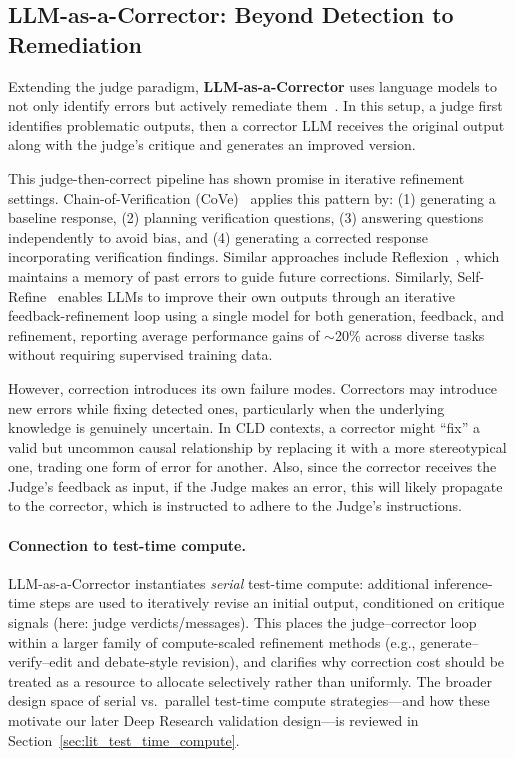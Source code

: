 \subsection{LLM-as-a-Corrector: Beyond Detection to Remediation}

Extending the judge paradigm, \textbf{LLM-as-a-Corrector} uses language models to not only identify errors but actively remediate them~\citep{shinn2024reflexion, dhuliawala2024chain}. In this setup, a judge first identifies problematic outputs, then a corrector LLM receives the original output along with the judge's critique and generates an improved version.

This judge-then-correct pipeline has shown promise in iterative refinement settings. Chain-of-Verification (CoVe)~\citep{dhuliawala2024chain} applies this pattern by: (1) generating a baseline response, (2) planning verification questions, (3) answering questions independently to avoid bias, and (4) generating a corrected response incorporating verification findings. Similar approaches include Reflexion~\citep{shinn2024reflexion}, which maintains a memory of past errors to guide future corrections. Similarly, Self-Refine~\citep{madaan2023selfrefineiterativerefinementselffeedback} enables LLMs to improve their own outputs through an iterative feedback-refinement loop using a single model for both generation, feedback, and refinement, reporting average performance gains of $\sim$20\% across diverse tasks without requiring supervised training data.

However, correction introduces its own failure modes. Correctors may introduce new errors while fixing detected ones, particularly when the underlying knowledge is genuinely uncertain. In CLD contexts, a corrector might ``fix'' a valid but uncommon causal relationship by replacing it with a more stereotypical one, trading one form of error for another. Also, since the corrector receives the Judge's feedback as input, if the Judge makes an error, this will likely propagate to the corrector, which is instructed to adhere to the Judge's instructions.


\paragraph{Connection to test-time compute.}
LLM-as-a-Corrector instantiates \emph{serial} test-time compute: additional inference-time steps are used to iteratively revise an initial output, conditioned on critique signals (here: judge verdicts/messages). This places the judge--corrector loop within a larger family of compute-scaled refinement methods (e.g., generate--verify--edit and debate-style revision), and clarifies why correction cost should be treated as a resource to allocate selectively rather than uniformly. The broader design space of serial vs.\ parallel test-time compute strategies---and how these motivate our later Deep Research validation design---is reviewed in Section~\ref{sec:lit_test_time_compute}.

